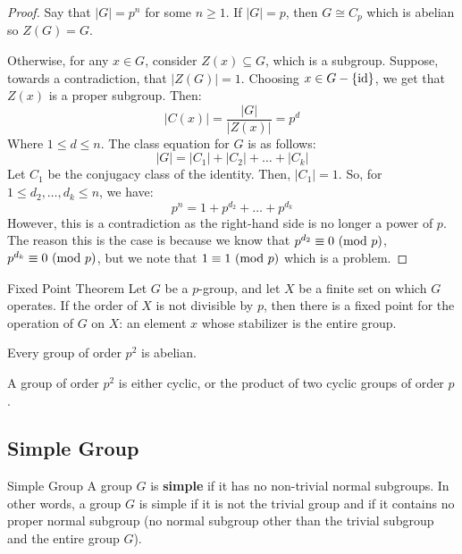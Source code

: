 \documentclass[letterpaper]{article}
\begin{document}
\begin{mdframed}
    \begin{proof}
        Say that $|G| = p^n$ for some $n \geq 1$. If $|G| = p$, then $G \cong C_p$ which is abelian so $Z(G) = G$. 
        
        \bigskip 

        Otherwise, for any $x \in G$, consider $Z(x) \subseteq G$, which is a subgroup. Suppose, towards a contradiction, that $|Z(G)| = 1$. Choosing $x \in G - \{\operatorname{id}\}$, we get that $Z(x)$ is a proper subgroup. Then: 
        \[|C(x)| = \frac{|G|}{|Z(x)|} = p^d\]
        Where $1 \leq d \leq n$. The class equation for $G$ is as follows: 
        \[|G| = |C_1| + |C_2| + \dots + |C_k|\]
        Let $C_1$ be the conjugacy class of the identity. Then, $|C_1| = 1$. So, for $1 \leq d_2, \dots, d_k \leq n$, we have: 
        \[p^n = 1 + p^{d_2} + \dots + p^{d_k}\]
        However, this is a contradiction as the right-hand side is no longer a power of $p$. The reason this is the case is because we know that $p^{d_2} \equiv 0 \ (\mathrm{mod}\ p)$, $p^{d_k} \equiv 0 \ (\mathrm{mod}\ p)$, but we note that $1 \equiv 1 \ (\mathrm{mod}\ p)$ which is a problem. 
    \end{proof}
\end{mdframed}

\begin{theorem}{Fixed Point Theorem}{}
    Let $G$ be a $p$-group, and let $X$ be a finite set on which $G$ operates. If the order of $X$ is not divisible by $p$, then there is a fixed point for the operation of $G$ on $X$: an element $x$ whose stabilizer is the entire group. 
\end{theorem}

\begin{mdframed}
    \begin{proposition}
        Every group of order $p^2$ is abelian. 
    \end{proposition}
\end{mdframed}

\begin{corollary}{}{}
    A group of order $p^2$ is either cyclic, or the product of two cyclic groups of order $p$. 
\end{corollary}


\subsection{Simple Group}
\begin{definition}{Simple Group}{}
    A group $G$ is \textbf{simple} if it has no non-trivial normal subgroups. In other words, a group $G$ is simple if it is not the trivial group and if it contains no proper normal subgroup (no normal subgroup other than the trivial subgroup and the entire group $G$). 
\end{definition}
\end{document}
